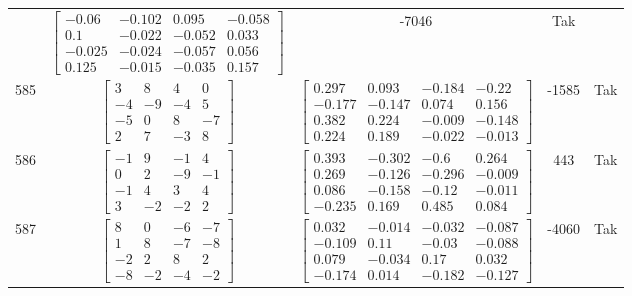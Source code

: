 \documentclass[a4paper,12pt]{article}
\begin{document}
\begin{tabular}{c c c c c}
&
$\begin{bmatrix} -0.06 & -0.102 & 0.095 & -0.058 \\ 0.1 & -0.022 & -0.052 & 0.033 \\ -0.025 & -0.024 & -0.057 & 0.056 \\ 0.125 & -0.015 & -0.035 & 0.157 \end{bmatrix}$
&
-7046
&
Tak
\\
585
&
$\begin{bmatrix} 3 & 8 & 4 & 0 \\ -4 & -9 & -4 & 5 \\ -5 & 0 & 8 & -7 \\ 2 & 7 & -3 & 8 \end{bmatrix}$
&
$\begin{bmatrix} 0.297 & 0.093 & -0.184 & -0.22 \\ -0.177 & -0.147 & 0.074 & 0.156 \\ 0.382 & 0.224 & -0.009 & -0.148 \\ 0.224 & 0.189 & -0.022 & -0.013 \end{bmatrix}$
&
-1585
&
Tak
\\
586
&
$\begin{bmatrix} -1 & 9 & -1 & 4 \\ 0 & 2 & -9 & -1 \\ -1 & 4 & 3 & 4 \\ 3 & -2 & -2 & 2 \end{bmatrix}$
&
$\begin{bmatrix} 0.393 & -0.302 & -0.6 & 0.264 \\ 0.269 & -0.126 & -0.296 & -0.009 \\ 0.086 & -0.158 & -0.12 & -0.011 \\ -0.235 & 0.169 & 0.485 & 0.084 \end{bmatrix}$
&
443
&
Tak
\\
587
&
$\begin{bmatrix} 8 & 0 & -6 & -7 \\ 1 & 8 & -7 & -8 \\ -2 & 2 & 8 & 2 \\ -8 & -2 & -4 & -2 \end{bmatrix}$
&
$\begin{bmatrix} 0.032 & -0.014 & -0.032 & -0.087 \\ -0.109 & 0.11 & -0.03 & -0.088 \\ 0.079 & -0.034 & 0.17 & 0.032 \\ -0.174 & 0.014 & -0.182 & -0.127 \end{bmatrix}$
&
-4060
&
Tak
\\

\end{tabular}
\end{document}
